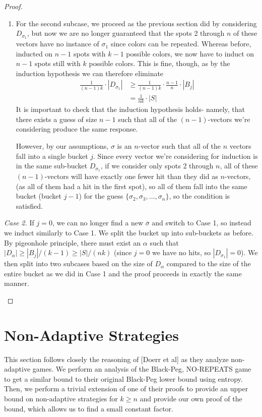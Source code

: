 \documentclass[12pt, a4paper]{article}
\begin{document}
\begin{proof}
\begin{enumerate}
\begin{enumerate}[label=\roman*.]
		\item For the second subcase, we proceed as the previous section did by
		considering $D_{\sigma_1}$, but now we are no longer guaranteed that the spots
		2 through $n$ of these vectors have no
		instance of $\sigma_1$
		since colors can be repeated. Whereas before, inducted on $n-1$ spots with
		$k-1$ possible colors, we now have to induct on $n-1$ spots still with $k$
		possible colors. This is fine,
		though, as by the induction hypothesis we can therefore eliminate
			\begin{align*}
			\frac{1}{(n-1)k}\cdot|D_{\sigma_1}|
			& \ge \frac{1}{(n-1)k}\cdot\frac{n-1}{n}\cdot|B_j|\\
			& = \frac{1}{nk}\cdot|S|
			\end{align*}
		It is important to check that the induction hypothesis holds- namely, that
		there exists a guess of size $n-1$ such that all of the $(n-1)$-vectors
		we're considering produce the same response.
		
		However, by our assumptions, $\sigma$ is an $n$-vector such that all of the
		$n$ vectors fall into a  single bucket $j$. Since every vector we're
		considering for induction is in the same sub-bucket 
		$D_{\sigma_1}$, if we consider only spots 2 through $n$, all of these
		$(n-1)$-vectors will have exactly one fewer hit than they did as $n$-vectors,
		(as all of them had a hit in the first spot), so all of them fall into the
		same bucket (bucket $j-1$) for the guess
		$\{\sigma_2, \sigma_3, \ldots, \sigma_n\}$, so the condition is satisfied.
		\end{enumerate}

		\textit{Case 2.} If $j=0$, we can no longer find a new $\overline{\sigma}$
		and switch to Case 1, so instead we
		induct similarly to Case 1. We split the
		bucket up into sub-buckets as before. By pigeonhole principle, there must exist
		an $\alpha$ such that
		$|D_\alpha| \ge |B_j|/(k-1) \ge |S|/(nk)$ (since $j=0$ we have no hits, so
		$|D_{\sigma_1}| = 0$).  We then 
		split into two subcases based on the size of $D_\alpha$ compared to the size of
		the entire bucket as we did in Case 1 and the proof proceeds in exactly the
		same manner.
		\end{enumerate}
	\end{proof}
	
\section{Non-Adaptive Strategies}
This section follows closely the reasoning of [Doerr et al] as they analyze non-adaptive games. 
We perform an analysis of the Black-Peg, NO-REPEATS game to get a similar bound to their original
Black-Peg lower bound using entropy. Then, we perform a trivial extension of one of their proofs to 
provide an upper bound on non-adaptive strategies for $k \geq n$ and provide our own proof of the
bound, which allows us to find a small constant factor.
\end{document}
